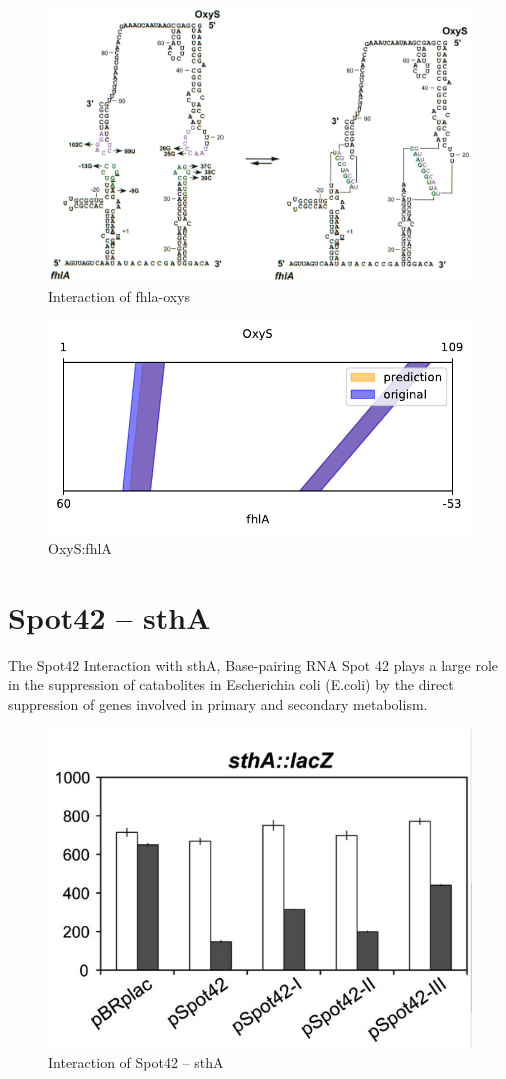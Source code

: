 \documentclass[twoside,a4paper]{report}
\begin{document}
	\begin{figure}[h!tb]
	\includegraphics[width=1.0\linewidth]{oxys}
	\centering
	\caption{ Interaction of fhla-oxys } 
	\label{fig:oxys}
	\end{figure}

\begin{figure}[h!tb]
	\centering
	\includegraphics[width=.4\linewidth]{rricomparison1.pdf}
	\caption{OxyS:fhlA}
	\label{fig:rricomparison1}
\end{figure}

\clearpage
	
	
	
	\section{Spot42 – sthA }
	
	The Spot42 Interaction with sthA, Base-pairing RNA Spot 42 plays a large role in the suppression of catabolites in Escherichia coli (E.coli) by the direct suppression of genes involved in primary and secondary metabolism.\\
	
		\begin{figure}[h!tb]
		\includegraphics[width=0.6\linewidth]{spot42}
		\centering
		\caption{ Interaction of Spot42 – sthA } 
		\label{fig:spot42}
	\end{figure}
\end{document}
